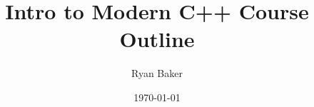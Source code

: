 \documentclass{article}
\title{Intro to Modern C++ Course Outline}
\author{Ryan Baker}
\date{\today}
\begin{document}
\maketitle
\pagebreak

\begin{center}
\section*{}	
\end{center}

\end{document}
